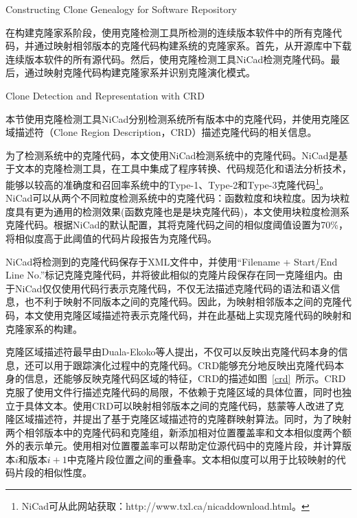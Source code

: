 {Constructing Clone Genealogy for Software Repository}

在构建克隆家系阶段，使用克隆检测工具所检测的连续版本软件中的所有克隆代码，并通过映射相邻版本的克隆代码构建系统的克隆家系。首先，从开源库中下载连续版本软件的所有源代码。然后，使用克隆检测工具NiCad检测克隆代码。最后，通过映射克隆代码构建克隆家系并识别克隆演化模式。

{Clone Detection and Representation with CRD}

本节使用克隆检测工具NiCad分别检测系统所有版本中的克隆代码，并使用克隆区域描述符（Clone Region Description，CRD）描述克隆代码的相关信息。

为了检测系统中的克隆代码，本文使用NiCad\cite{roy2008nicad}检测系统中的克隆代码。NiCad是基于文本的克隆检测工具，在工具中集成了程序转换、代码规范化和语法分析技术\cite{cordy2006txl,dean2003agile}，能够以较高的准确度和召回率系统中的Type-1、Type-2和Type-3克隆代码\footnote{NiCad可从此网站获取：http://www.txl.ca/nicaddownload.html。}。NiCad可以从两个不同粒度检测系统中的克隆代码：函数粒度和块粒度。因为块粒度具有更为通用的检测效果(函数克隆也是是块克隆代码)，本文使用{块粒度}检测系克隆代码。根据NiCad的默认配置，其将克隆代码之间的相似度阈值设置为70\%，将相似度高于此阈值的代码片段报告为克隆代码。


NiCad将检测到的克隆代码保存于XML文件中，并使用{“Filename + Start/End Line No.”}标记克隆克隆代码，并将彼此相似的克隆片段保存在同一克隆组内。由于NiCad仅仅使用代码行表示克隆代码，不仅无法描述克隆代码的语法和语义信息，也不利于映射不同版本之间的克隆代码。因此，为映射相邻版本之间的克隆代码，本文使用克隆区域描述符表示克隆代码，并在此基础上实现克隆代码的映射和克隆家系的构建。

克隆区域描述符最早由Duala-Ekoko等人提出，不仅可以反映出克隆代码本身的信息，还可以用于跟踪演化过程中的克隆代码\cite{duala2010clone}。CRD能够充分地反映出克隆代码本身的信息，还能够反映克隆代码区域的特征，CRD的描述如图~\ref{crd}~所示。CRD克服了使用文件行描述克隆代码的局限，不依赖于克隆区域的具体位置，同时也独立于具体文本。使用CRD可以映射相邻版本之间的克隆代码，慈蒙等人改进了克隆区域描述符，并提出了基于克隆区域描述符的克隆群映射算法\cite{ci2013new,ci2013newD}。同时，为了映射两个相邻版本中的克隆代码和克隆组，新添加相对位置覆盖率和文本相似度两个额外的表示单元。使用相对位置覆盖率可以帮助定位源代码中的克隆片段，并计算版本$i$和版本$i+1$中克隆片段位置之间的重叠率。文本相似度可以用于比较映射的代码片段的相似性度。


